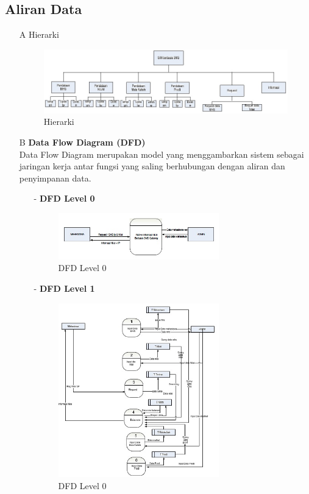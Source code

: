 \documentclass{jtetiproposalskripsi}
\begin{document}
\subsection{Aliran Data}
\begin{itemize}
\item[A]Hierarki

\begin{figure}[ht!]
  \centering
    \includegraphics[width=1\textwidth]{gambar/3}
    \caption{Hierarki}
    \label{wsn}
\end{figure}
\newpage

\item[B]\textbf{Data Flow Diagram (DFD)}
\\
Data Flow Diagram merupakan model yang menggambarkan sistem sebagai jaringan kerja antar fungsi yang saling berhubungan dengan aliran dan penyimpanan data.
\begin{itemize}
\item[-] \textbf{DFD Level 0}
\begin{figure}[ht!]
  \centering
    \includegraphics[width=0.7\textwidth]{gambar/4}
    \caption{DFD Level 0}
    \label{wsn}
\end{figure}

\item[-] \textbf{DFD Level 1}
\begin{figure}[ht!]
  \centering
    \includegraphics[width=0.7\textwidth]{gambar/5}
    \caption{DFD Level 0}
    \label{wsn}
\end{figure}
\end{itemize}
\end{itemize}
\end{document}
